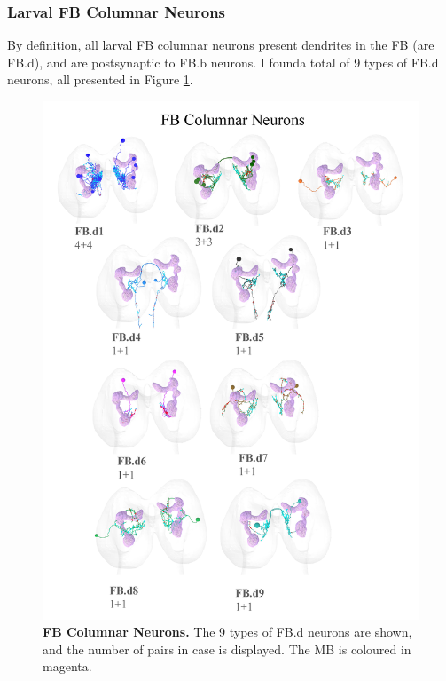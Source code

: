         \subsubsection{Larval FB Columnar Neurons}


            By definition, all larval FB columnar neurons present dendrites in the FB (are FB.d), and are postsynaptic to FB.b neurons. I founda total of 9 types of FB.d neurons, all presented in Figure \ref{FBColumnar}. 

            \begin{figure}
                \centering
                \includegraphics[width=15cm]{Figs/CX/FBColumnar.pdf}
                \caption[FB Columnar Neurons]{\textbf{FB Columnar Neurons.} The 9 types of FB.d neurons are shown, and the number of pairs in case is displayed. The MB is coloured in magenta. }
                \label{FBColumnar}
            \end{figure}



